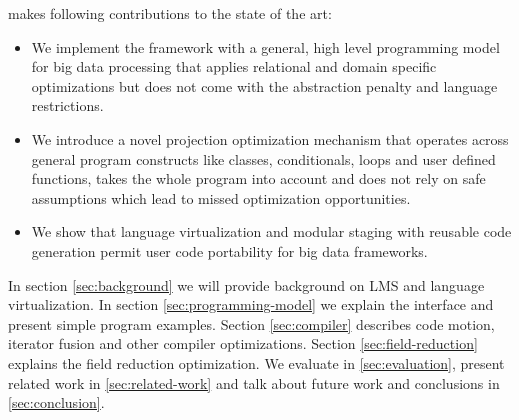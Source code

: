 \tool makes following contributions to the state of the art:    
\begin{itemize}

  \item We implement the \tool framework with a general, high level programming model for big data processing that applies relational and domain specific optimizations but does not come with the abstraction penalty and language restrictions.

  \item We introduce a novel projection optimization mechanism that operates across general program constructs like classes, conditionals, loops and user defined functions, takes the whole program into account and does not rely on safe assumptions which lead to missed optimization opportunities.

  \item We show that language virtualization and modular staging with reusable code generation permit user code portability for big data frameworks. 

\end{itemize} 

In section \ref{sec:background} we will provide background on LMS and language virtualization. In section \ref{sec:programming-model} we explain the interface and present simple program examples. Section \ref{sec:compiler} describes code motion, iterator fusion and other compiler optimizations. Section \ref{sec:field-reduction} explains the field reduction optimization. We evaluate \tool in \ref{sec:evaluation}, present related work in \ref{sec:related-work} and talk about future work and conclusions in \ref{sec:conclusion}.